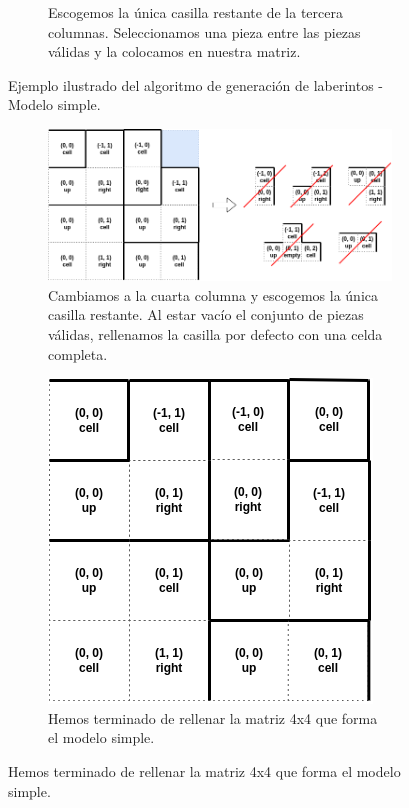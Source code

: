 \begin{figure}[H]
\begin{subfigure}[b]{0.95\textwidth}
            \caption{Escogemos la única casilla restante de la tercera columnas. Seleccionamos una pieza entre las piezas válidas y la colocamos en nuestra matriz.}
        \end{subfigure}
        \caption{Ejemplo ilustrado del algoritmo de generación de laberintos - Modelo simple.}
        \label{fig:simple2}
    \end{figure}
    
    \begin{figure}[H]
    \ContinuedFloat 
    \centering
        \begin{subfigure}[b]{0.95\textwidth}
            \centering
            \includegraphics[scale=0.45]{img/paso7.png}
            \caption{Cambiamos a la cuarta columna y escogemos la única casilla restante. Al estar vacío el conjunto de piezas válidas, rellenamos la casilla por defecto con una celda completa.}
        \end{subfigure}
        \par\bigskip
        \begin{subfigure}[b]{0.95\textwidth}
            \centering
            \includegraphics[scale=0.45]{img/paso8.png}
            \caption{Hemos terminado de rellenar la matriz 4x4 que forma el modelo simple.}

\end{subfigure}
\end{figure}
